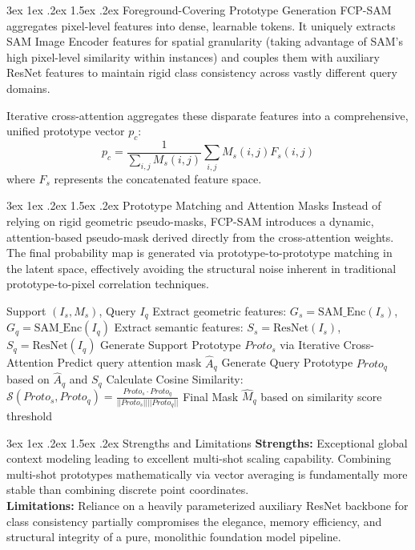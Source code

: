 \documentclass[journal,12pt,onecolumn,draftclsnofoot]{IEEEtran}
\makeatletter
\renewcommand{\subsection}{\@startsection{subsection}{2}{\z@}%
    {3ex \@plus 1ex \@minus .2ex}%
    {1.5ex \@plus.2ex}%
    {\normalfont\large\bfseries}}
\makeatother
\begin{document}
\subsection{Foreground-Covering Prototype Generation}
FCP-SAM aggregates pixel-level features into dense, learnable tokens. It uniquely extracts SAM Image Encoder features for spatial granularity (taking advantage of SAM's high pixel-level similarity within instances) and couples them with auxiliary ResNet features to maintain rigid class consistency across vastly different query domains. 

Iterative cross-attention aggregates these disparate features into a comprehensive, unified prototype vector $p_c$:
\begin{equation}
    p_c = \frac{1}{\sum_{i,j} M_{s}(i,j)} \sum_{i,j} M_{s}(i,j) F_{s}(i,j)
\end{equation}
where $F_s$ represents the concatenated feature space.

\subsection{Prototype Matching and Attention Masks}
Instead of relying on rigid geometric pseudo-masks, FCP-SAM introduces a dynamic, attention-based pseudo-mask derived directly from the cross-attention weights. The final probability map is generated via prototype-to-prototype matching in the latent space, effectively avoiding the structural noise inherent in traditional prototype-to-pixel correlation techniques.

\begin{algorithm}[H]
\caption{FCP-SAM Prototype Matching}
\begin{algorithmic}[1]
\REQUIRE Support $(I_s, M_s)$, Query $I_q$
\STATE Extract geometric features: $G_s = \text{SAM\_Enc}(I_s)$, $G_q = \text{SAM\_Enc}(I_q)$
\STATE Extract semantic features: $S_s = \text{ResNet}(I_s)$, $S_q = \text{ResNet}(I_q)$
\STATE Generate Support Prototype $Proto_s$ via Iterative Cross-Attention
\STATE Predict query attention mask $\hat{A}_q$
\STATE Generate Query Prototype $Proto_q$ based on $\hat{A}_q$ and $S_q$
\STATE Calculate Cosine Similarity: $\mathcal{S}(Proto_s, Proto_q) = \frac{Proto_s \cdot Proto_q}{||Proto_s|| ||Proto_q||}$
\RETURN Final Mask $\hat{M}_q$ based on similarity score threshold
\end{algorithmic}
\end{algorithm}

\subsection{Strengths and Limitations}
\textbf{Strengths:} Exceptional global context modeling leading to excellent multi-shot scaling capability. Combining multi-shot prototypes mathematically via vector averaging is fundamentally more stable than combining discrete point coordinates.\\
\textbf{Limitations:} Reliance on a heavily parameterized auxiliary ResNet backbone for class consistency partially compromises the elegance, memory efficiency, and structural integrity of a pure, monolithic foundation model pipeline.
\end{document}
